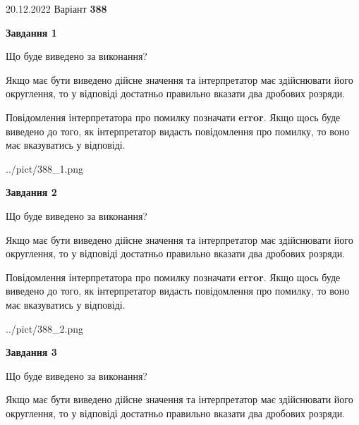 \documentclass[12pt, ukrainian]{article}
\begin{document}
{20.12.2022 Варіант \No \textbf { 388 }\par}
{
\begin {Large}

{\begin {center}\textbf{Завдання 1}\end {center}}\par
Що буде виведено за виконання? \par

Якщо має бути виведено дійсне значення та інтерпретатор має здійснювати його округлення, 
то у відповіді достатньо правильно вказати два дробових розряди.

Повідомлення інтерпретатора про помилку позначати \textbf{error}.
Якщо щось буде виведено до того, як інтерпретатор видасть повідомлення про помилку, 
то воно має вказуватись у відповіді. \par

\begin{center}
	{../pict/388_1.png}
\end{center}
\newpage

{\begin {center}\textbf{Завдання 2}\end {center}}\par
Що буде виведено за виконання? \par

Якщо має бути виведено дійсне значення та інтерпретатор має здійснювати його округлення, 
то у відповіді достатньо правильно вказати два дробових розряди.

Повідомлення інтерпретатора про помилку позначати \textbf{error}.
Якщо щось буде виведено до того, як інтерпретатор видасть повідомлення про помилку, 
то воно має вказуватись у відповіді. \par

\begin{center}
	{../pict/388_2.png}
\end{center}
\newpage

{\begin {center}\textbf{Завдання 3}\end {center}}\par
Що буде виведено за виконання? \par

Якщо має бути виведено дійсне значення та інтерпретатор має здійснювати його округлення, 
то у відповіді достатньо правильно вказати два дробових розряди.


\end{Large}}
\end{document}
